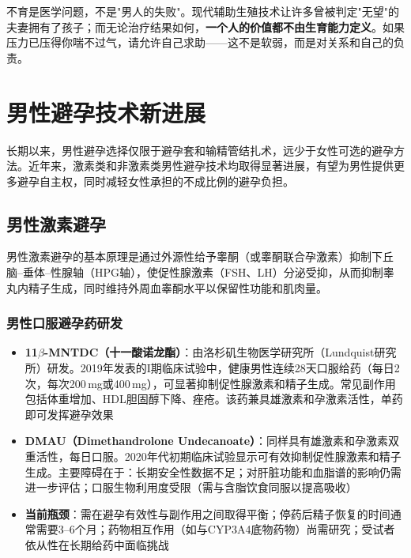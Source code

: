 \begin{tcolorbox}[colback=pink!5!white,colframe=red!50!black,title=贴心小叮咛]
不育是医学问题，不是"男人的失败"。现代辅助生殖技术让许多曾被判定"无望"的夫妻拥有了孩子；而无论治疗结果如何，\textbf{一个人的价值都不由生育能力定义}。如果压力已压得你喘不过气，请允许自己求助——这不是软弱，而是对关系和自己的负责。
\end{tcolorbox}


\section{男性避孕技术新进展}

长期以来，男性避孕选择仅限于避孕套和输精管结扎术，远少于女性可选的避孕方法。近年来，激素类和非激素类男性避孕技术均取得显著进展，有望为男性提供更多避孕自主权，同时减轻女性承担的不成比例的避孕负担。

\subsection{男性激素避孕}

男性激素避孕的基本原理是通过外源性给予睾酮（或睾酮联合孕激素）抑制下丘脑--垂体--性腺轴（HPG轴），使促性腺激素（FSH、LH）分泌受抑，从而抑制睾丸内精子生成，同时维持外周血睾酮水平以保留性功能和肌肉量。

\subsubsection{男性口服避孕药研发}

\begin{itemize}[leftmargin=2cm]
	\item \textbf{11$\beta$-MNTDC（十一酸诺龙酯）}：由洛杉矶生物医学研究所（Lundquist研究所）研发。2019年发表的I期临床试验中，健康男性连续28天口服给药（每日2次，每次200\,mg或400\,mg），可显著抑制促性腺激素和精子生成。常见副作用包括体重增加、HDL胆固醇下降、痤疮。该药兼具雄激素和孕激素活性，单药即可发挥避孕效果
	\item \textbf{DMAU（Dimethandrolone Undecanoate）}：同样具有雄激素和孕激素双重活性，每日口服。2020年代初期临床试验显示可有效抑制促性腺激素和精子生成。主要障碍在于：长期安全性数据不足；对肝脏功能和血脂谱的影响仍需进一步评估；口服生物利用度受限（需与含脂饮食同服以提高吸收）
	\item \textbf{当前瓶颈}：需在避孕有效性与副作用之间取得平衡；停药后精子恢复的时间通常需要3--6个月；药物相互作用（如与CYP3A4底物药物）尚需研究；受试者依从性在长期给药中面临挑战
\end{itemize}

